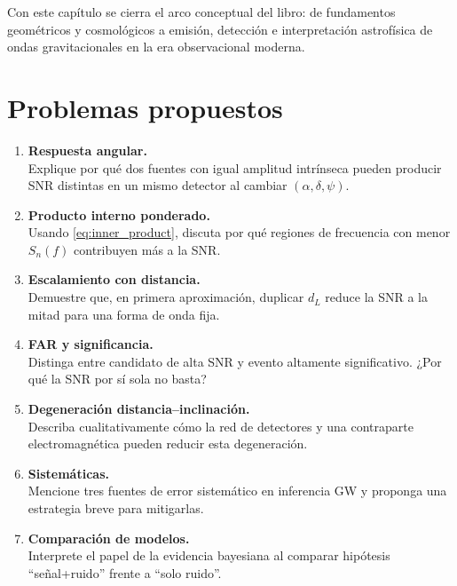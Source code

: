 Con este capítulo se cierra el arco conceptual del libro: de fundamentos geométricos y cosmológicos a emisión, detección e interpretación astrofísica de ondas gravitacionales en la era observacional moderna.

\section*{Problemas propuestos}

\begin{enumerate}[leftmargin=2.2em, label=\textbf{P\arabic*.}]

\item \textbf{Respuesta angular.} \\
Explique por qué dos fuentes con igual amplitud intrínseca pueden producir SNR distintas en un mismo detector al cambiar $(\alpha,\delta,\psi)$.

\item \textbf{Producto interno ponderado.} \\
Usando \eqref{eq:inner_product}, discuta por qué regiones de frecuencia con menor $S_n(f)$ contribuyen más a la SNR.

\item \textbf{Escalamiento con distancia.} \\
Demuestre que, en primera aproximación, duplicar $d_L$ reduce la SNR a la mitad para una forma de onda fija.

\item \textbf{FAR y significancia.} \\
Distinga entre candidato de alta SNR y evento altamente significativo. ¿Por qué la SNR por sí sola no basta?

\item \textbf{Degeneración distancia--inclinación.} \\
Describa cualitativamente cómo la red de detectores y una contraparte electromagnética pueden reducir esta degeneración.

\item \textbf{Sistemáticas.} \\
Mencione tres fuentes de error sistemático en inferencia GW y proponga una estrategia breve para mitigarlas.

\item \textbf{Comparación de modelos.} \\
Interprete el papel de la evidencia bayesiana al comparar hipótesis ``señal+ruido'' frente a ``solo ruido''.


\end{enumerate}
